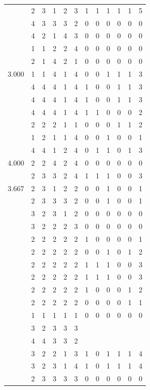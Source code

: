 \documentclass[]{msu-thesis}
\theoremstyle{definition}
\theoremstyle{definition}
\theoremstyle{definition}
\theoremstyle{remark}
\begin{document}
\begin{table}
{\begin{tabular}[t]{rrrrrrrrrrrr}
 & 2 & 3 & 1 & 2 & 3 & 1 & 1 & 1 & 1 & 1 & 5\\
 & 4 & 3 & 3 & 3 & 2 & 0 & 0 & 0 & 0 & 0 & 0\\
 & 4 & 2 & 1 & 4 & 3 & 0 & 0 & 0 & 0 & 0 & 0\\
 & 1 & 1 & 2 & 2 & 4 & 0 & 0 & 0 & 0 & 0 & 0\\
 & 2 & 1 & 4 & 2 & 1 & 0 & 0 & 0 & 0 & 0 & 0\\
3.000 & 1 & 1 & 4 & 1 & 4 & 0 & 0 & 1 & 1 & 1 & 3\\
 & 4 & 4 & 4 & 1 & 4 & 1 & 0 & 0 & 1 & 1 & 3\\
 & 4 & 4 & 4 & 1 & 4 & 1 & 0 & 0 & 1 & 1 & 3\\
 & 4 & 4 & 4 & 1 & 4 & 1 & 1 & 0 & 0 & 0 & 2\\
 & 2 & 2 & 2 & 1 & 1 & 0 & 0 & 0 & 1 & 1 & 2\\
 & 1 & 2 & 1 & 1 & 4 & 0 & 0 & 1 & 0 & 0 & 1\\
 & 4 & 4 & 1 & 2 & 4 & 0 & 1 & 1 & 0 & 1 & 3\\
4.000 & 2 & 2 & 4 & 2 & 4 & 0 & 0 & 0 & 0 & 0 & 0\\
 & 2 & 3 & 3 & 2 & 4 & 1 & 1 & 1 & 0 & 0 & 3\\
3.667 & 2 & 3 & 1 & 2 & 2 & 0 & 0 & 1 & 0 & 0 & 1\\
 & 2 & 3 & 3 & 3 & 2 & 0 & 0 & 1 & 0 & 0 & 1\\
 & 3 & 2 & 3 & 1 & 2 & 0 & 0 & 0 & 0 & 0 & 0\\
 & 3 & 2 & 2 & 2 & 3 & 0 & 0 & 0 & 0 & 0 & 0\\
 & 2 & 2 & 2 & 2 & 2 & 1 & 0 & 0 & 0 & 0 & 1\\
 & 2 & 2 & 2 & 2 & 2 & 0 & 0 & 1 & 0 & 1 & 2\\
 & 2 & 2 & 2 & 2 & 2 & 1 & 1 & 1 & 0 & 0 & 3\\
 & 2 & 2 & 2 & 2 & 2 & 1 & 1 & 1 & 0 & 0 & 3\\
 & 2 & 2 & 2 & 2 & 2 & 1 & 0 & 0 & 0 & 1 & 2\\
 & 2 & 2 & 2 & 2 & 2 & 0 & 0 & 0 & 0 & 1 & 1\\
 & 1 & 1 & 1 & 1 & 1 & 0 & 0 & 0 & 0 & 0 & 0\\
 & 3 & 2 & 3 & 3 & 3 &  &  &  &  &  & \\
 & 4 & 4 & 3 & 3 & 2 &  &  &  &  &  & \\
 & 3 & 2 & 2 & 1 & 3 & 1 & 0 & 1 & 1 & 1 & 4\\
 & 3 & 2 & 3 & 1 & 4 & 1 & 0 & 1 & 1 & 1 & 4\\
 & 2 & 3 & 3 & 3 & 3 & 0 & 0 & 0 & 0 & 0 & 0\\

\end{tabular}}
\end{table}
\end{document}
